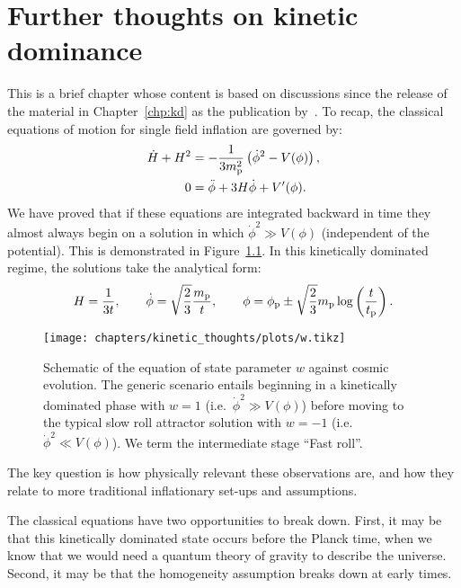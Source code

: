 \chapter{Further thoughts on kinetic dominance}
\label{chp:kt}

This is a brief chapter whose content is based on discussions since the release of the material in Chapter~\ref{chp:kd} as the publication by~\cite{Handley+2014}.
To recap, the classical equations of motion for single field inflation are
governed by:
%
\begin{align}
  \dot{H} + H^2 
  &= - \frac{1}{3m_{\mathrm{p}}^2}\left( \dot{\phi}^2 - V(\phi)\right),
  \label{eqn:kt:raychaudhuri}
  \\
  0 &= \ddot{\phi} + 3H\dot\phi + V^\prime({\phi}).
  \label{eqn:kt:kleingordon}
\end{align}
%
We have proved that if these equations are integrated backward in time they almost always begin on a solution in which \(\dot\phi^2\gg V(\phi)\) (independent of the potential). This is demonstrated in Figure~\ref{fig:kt:w}. In this kinetically dominated regime, the solutions take the analytical form:
\begin{equation}
  H = \frac{1}{3t},
  \qquad 
  \dot{\phi} = \sqrt{\frac 2 3}\frac{m_{\mathrm{p}}}{t}, 
  \qquad 
  \phi = \phi_{\mathrm{p}} \pm \sqrt{\frac 2 3}m_{\mathrm{p}} \log\left( \frac t {t_{\mathrm{p}}} \right).
\end{equation}
\begin{figure}[tp]
  \texttt{[image: chapters/kinetic\_thoughts/plots/w.tikz]}
  \caption{%
    Schematic of the equation of state parameter \(w\) against cosmic
    evolution. The generic scenario entails beginning in a kinetically
    dominated phase with \(w=1\) (i.e.\ \(\dot{\phi}^2\gg V(\phi)\))
    before moving to the typical slow roll attractor solution with
    \(w=-1\) (i.e.\ \(\dot{\phi}^2 \ll V(\phi)\)). We term the
    intermediate stage ``Fast roll''.\label{fig:kt:w}
  }
\end{figure}

The key question is how physically relevant these observations are, and how they relate to more traditional inflationary set-ups and assumptions.

The classical equations have two opportunities to break down. First, it may be that this kinetically dominated state occurs before the Planck time, when we know that we would need a quantum theory of gravity to describe the universe. Second, it may be that the homogeneity assumption breaks down at early times.


